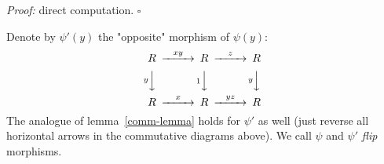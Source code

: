 \documentclass[12pt]{article}
\begin{document}
\emph{Proof:} direct computation. $\square$ 

\vspace{0.1in} 

Denote by $\psi'(y)$ the "opposite" morphism of $\psi(y)$: 
  \begin{equation*}
   \begin{CD}
     R @>{xy}>> R @>{z}>> R  \\
     @V{y}VV      @V{1}VV   @V{y}VV \\
     R @>{x}>> R @>{yz}>> R
   \end{CD}
 \end{equation*}
The analogue of lemma~\ref{comm-lemma} holds for $\psi'$ 
as well (just reverse all horizontal arrows in the commutative 
diagrams above).  We call $\psi$ and $\psi'$
\emph{flip} morphisms. 

\vspace{0.1in} 
\end{document}
